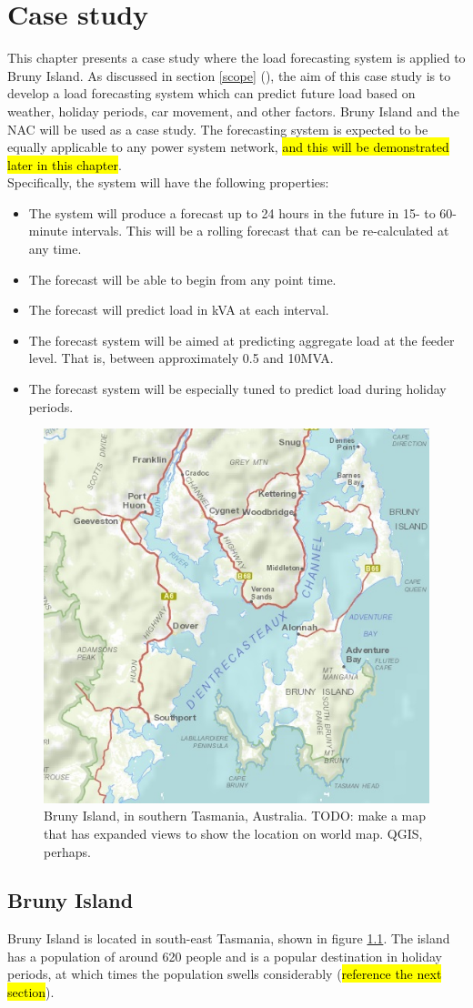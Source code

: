 \chapter{Case study}
This chapter presents a case study where the load forecasting system is applied to Bruny Island.
As discussed in section \ref{scope} (), the aim of this case study is to develop a load forecasting system which can predict future load based on weather, holiday periods, car movement, and other factors. 
Bruny Island and the NAC will be used as a case study. 
The forecasting system is expected to be equally applicable to any power system network, \hl{and this will be demonstrated later in this chapter}.
\\
Specifically, the system will have the following properties:
\begin{itemize}
	\item The system will produce a forecast up to 24 hours in the future in 15- to 60-minute intervals. This will be a rolling forecast that can be re-calculated at any time.
	\item The forecast will be able to begin from any point time.
	\item The forecast will predict load in kVA at each interval.
	\item The forecast system will be aimed at predicting aggregate load at the feeder level. That is, between approximately 0.5 and 10MVA.
	\item The forecast system will be especially tuned to predict load during holiday periods.
\end{itemize}

\begin{figure}
	\centering
	\includegraphics[width=0.35\linewidth]{images/bruny-basic}
	\caption{Bruny Island, in southern Tasmania, Australia. TODO: make a map that has expanded views to show the location on world map. QGIS, perhaps.}
	\label{fig:bruny-basic}
\end{figure}

\section{Bruny Island}
Bruny Island is located in south-east Tasmania, shown in figure \ref{fig:bruny-basic}.
The island has a population of around 620 people and is a popular destination in holiday periods, at which times the population swells considerably (\hl{reference the next section}).

